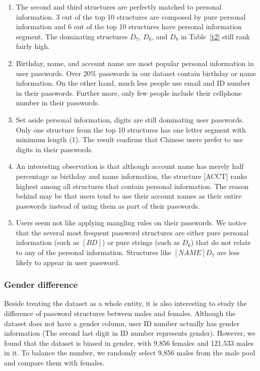 \documentclass{sig-alternate}
\begin{document}
\begin{enumerate}[leftmargin=*]
\item The second and third structures are perfectly matched to personal information. 3 out of the top 10 structures are composed by pure personal information and 6 out of the top 10 structures have personal information segment. The dominating structures $D_7$, $D_6$, and $D_8$ in Table~\ref{t2} still rank fairly high.
\item Birthday, name, and account name are most popular personal information in user passwords. Over 20\% passwords in our dataset contain birthday or name information. On the other hand, much less people use email and ID number in their passwords. Further more, only few people include their cellphone number in their passwords.  
\item Set aside personal information, digits are still dominating user passwords. Only one structure from the top 10 structures has one letter segment with minimum length (1). The result confirms that Chinese users prefer to use digits in their passwords.
\item An interesting observation is that although account name has merely half percentage as birthday and name information, the structure [ACCT] ranks highest among all structures that contain personal information. The reason behind may be that users tend to use their account names as their entire passwords instead of using them as part of their passwords. 
\item Users seem not like applying mangling rules on their passwords. We notice that the several most frequent password structures are either pure personal information (such as $[BD]$) or pure strings (such as $D_6$) that do not relate to any of the personal information. Structures like $[NAME]D_7$ are less likely to appear in user password.
\end{enumerate}

\subsubsection{Gender difference}
\label{genderdifference}
Beside treating the dataset as a whole entity, it is also interesting to study the difference of password structures between males and females. Although the dataset does not have a gender column, user ID number actually has gender information (The second last digit in ID number represents gender). However, we found that the dataset is biased in gender, with 9,856 females and 121,533 males in it. To balance the number, we randomly select 9,856 males from the male pool and compare them with females. 
\end{document}
